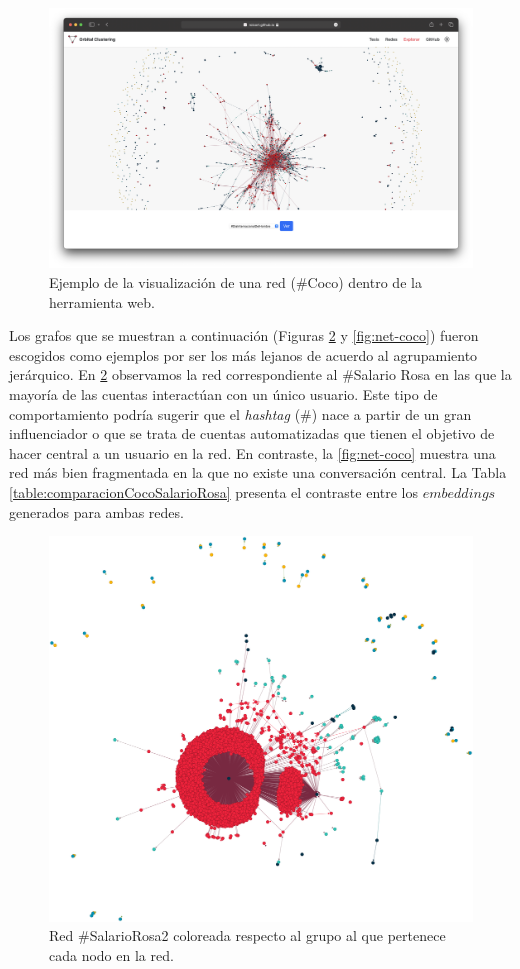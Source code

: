  \begin{figure}
   \centering
   \includegraphics[width=1\textwidth]{images/web-graph.png}
    \caption{Ejemplo de la visualización de una red (\#Coco) dentro de la herramienta web.}
    \label{img:web-graph}
\end{figure}

Los grafos que se muestran a continuación (Figuras \ref{fig:net-salario} y \ref{fig:net-coco}) fueron escogidos como ejemplos por ser los más lejanos de acuerdo al agrupamiento jerárquico. En \ref{fig:net-salario} observamos la red correspondiente al \#Salario Rosa en las que la mayoría de las cuentas interactúan con un único usuario. Este tipo de comportamiento podría sugerir que el \textit{hashtag} (\#) nace a partir de un gran influenciador o que se trata de cuentas automatizadas que tienen el objetivo de hacer central a un usuario en la red. En contraste, la \ref{fig:net-coco} muestra una red más bien fragmentada en la que no existe una conversación central. La Tabla \ref{table:comparacionCocoSalarioRosa} presenta el contraste entre los $embeddings$ generados para ambas redes.

\begin{figure}
    \centering
    \includegraphics[width=.75\textwidth]{images/SalarioRosa.png}
    \caption{Red \#SalarioRosa2 coloreada respecto al grupo al que pertenece cada nodo en la red.}
    \label{fig:net-salario}
\end{figure}

